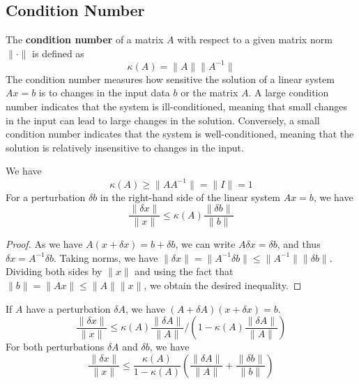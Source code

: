 \documentclass{matharticle}
\begin{document}
\subsection{Condition Number}
\begin{definition}
	The \textbf{condition number} of a matrix $A$ with respect to a given matrix norm $\|\cdot\|$ is defined as
	\begin{equation}
		\kappa(A) = \|A\| \|A^{-1}\|
	\end{equation}
	The condition number measures how sensitive the solution of a linear system $Ax = b$ is to changes in the input data $b$ or the matrix $A$. A large condition number indicates that the system is ill-conditioned, meaning that small changes in the input can lead to large changes in the solution. Conversely, a small condition number indicates that the system is well-conditioned, meaning that the solution is relatively insensitive to changes in the input.
\end{definition}

We have
\begin{equation}
	\kappa(A) \geq \|A A^{-1}\| = \|I\| = 1
\end{equation}
For a perturbation $\delta b$ in the right-hand side of the linear system $Ax = b$, we have
\begin{equation}
	\frac{\|\delta x\|}{\|x\|} \leq \kappa(A) \frac{\|\delta b\|}{\|b\|}
\end{equation}
\begin{proof}
	As we have $A(x+\delta x) = b + \delta b$, we can write $A \delta x = \delta b$, and thus $\delta x = A^{-1} \delta b$. Taking norms, we have $\|\delta x\| = \|A^{-1} \delta b\| \leq \|A^{-1}\| \|\delta b\|$. Dividing both sides by $\|x\|$ and using the fact that $\|b\| = \|Ax\| \leq \|A\| \|x\|$, we obtain the desired inequality.
\end{proof}
If $A$ have a perturbation $\delta A$, we have $(A + \delta A)(x + \delta x) = b$.
\begin{equation}
	\frac{\|\delta x\|}{\|x\|} \leq \kappa(A) \frac{\|\delta A\|}{\|A\|} \bigg/ \left(1 - \kappa(A) \frac{\|\delta A\|}{\|A\|}\right)
\end{equation}
For both perturbations $\delta A$ and $\delta b$, we have
\begin{equation}
	\frac{\|\delta x\|}{\|x\|} \leq \frac{\kappa(A)}{1 - \kappa(A)} \left( \frac{\|\delta A\|}{\|A\|} + \frac{\|\delta b\|}{\|b\|} \right)
\end{equation}
\end{document}
